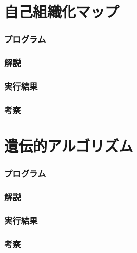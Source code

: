 \documentclass{jsarticle}
\begin{document}
\part{自己組織化マップ}
\section{プログラム}


\section{解説}


\section{実行結果}


\section{考察}


\part{遺伝的アルゴリズム}
\section{プログラム}


\section{解説}


\section{実行結果}


\section{考察}
\end{document}
